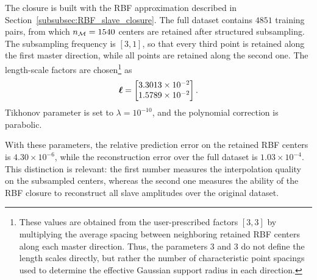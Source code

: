 \documentclass[11pt,a4paper]{article}
\begin{document}
The closure is built with the RBF approximation described in
Section~\ref{subsubsec:RBF_slave_closure}. The full dataset contains $4851$
training pairs, from which $n_{\mathcal{M}}=1540$ centers are retained after structured
subsampling. The subsampling frequency is $[3,1]$, so that every third point is
retained along the first master direction, while all points are retained along
the second one. The length-scale factors are chosen\footnote{These values are obtained from the user-prescribed factors
$[3,3]$ by multiplying the average spacing between neighboring retained RBF
centers along each master direction. Thus, the parameters $3$ and $3$ do not
define the length scales directly, but rather the number of characteristic
point spacings used to determine the effective Gaussian support radius in each
direction.} as
\[
    \bm{\ell} =
    \begin{bmatrix}
    3.3013\times 10^{-2}\\
    1.5789\times 10^{-2}
    \end{bmatrix}.
\]
     Tikhonov parameter is set to $\lambda=10^{-10}$,  and the
 polynomial correction is parabolic.

With these parameters, the relative prediction error on the retained RBF
centers is $4.30\times10^{-6}$, while the reconstruction error over the full
dataset is $1.03\times10^{-4}$. This distinction is relevant: the first number
measures the interpolation quality on the subsampled centers, whereas the
second one measures the ability of the RBF closure to reconstruct all slave
amplitudes over the original dataset.
\end{document}
